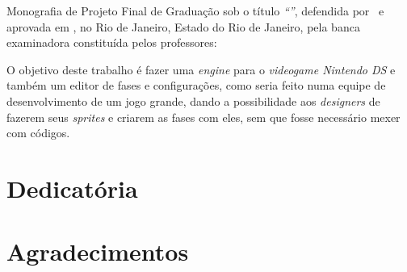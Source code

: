 \documentclass[brazil]{abnt}
\begin{document}

\capa
\folhaderosto

\begin{folhadeaprovacao}
Monografia de Projeto Final de Graduação sob o título \textit{``\ABNTtitulodata''},
defendida por \ABNTautordata~e aprovada em \ABNTdatadata, no Rio de Janeiro,
Estado do Rio de Janeiro, pela banca examinadora constituída pelos
professores: \setlength{\ABNTsignthickness}{0.4pt}

  
\end{folhadeaprovacao}

\begin{resumo}
O objetivo deste trabalho é fazer uma \textit{engine} para o \textit{videogame Nintendo DS\texttrademark} e também um editor de fases 
e configurações, como seria feito numa equipe de desenvolvimento de um jogo grande, dando a possibilidade aos \textit{designers} 
de fazerem seus \textit{sprites} e criarem as fases com eles, sem que fosse necessário mexer com códigos.
\end{resumo}

\begin{abstract}
The objective of this paper is to make an engine to the Nintendo DS\texttrademark system and a level and configurations editor, as it
would be done in a development team in a big game, giving designers the possibility to make their sprites and create their levels 
without touching actual source code.
\end{abstract}

\chapter*{Dedicatória}

\chapter*{Agradecimentos}
\end{document}
